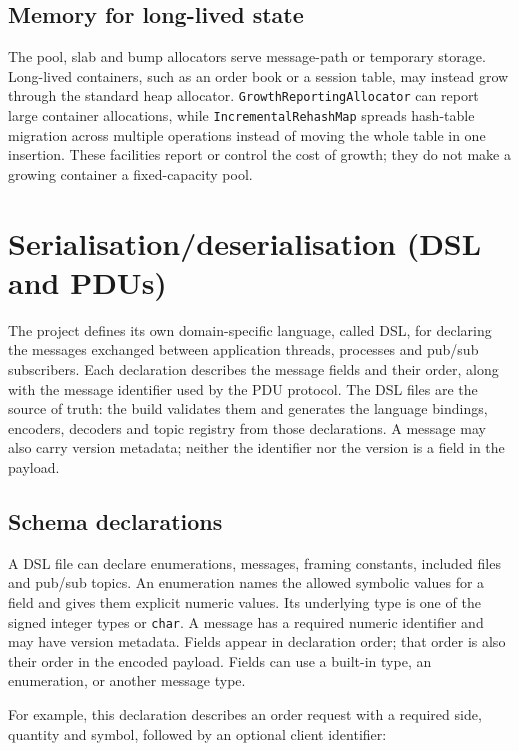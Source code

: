 \subsection{Memory for long-lived state}

The pool, slab and bump allocators serve message-path or temporary storage.
Long-lived containers, such as an order book or a session table, may instead
grow through the standard heap allocator. \texttt{GrowthReportingAllocator}
can report large container allocations, while \texttt{IncrementalRehashMap}
spreads hash-table migration across multiple operations instead of moving the
whole table in one insertion. These facilities report or control the cost of
growth; they do not make a growing container a fixed-capacity pool.

\section{Serialisation/deserialisation (DSL and PDUs)}
\label{sec:fw_dsl}

The project defines its own domain-specific language, called DSL, for
declaring the messages exchanged between application threads, processes and
pub/sub subscribers. Each declaration describes the message fields and their
order, along with the message identifier used by the PDU protocol. The DSL
files are the source of truth: the build validates them and generates the
language bindings, encoders, decoders and topic registry from those
declarations. A message may also carry version metadata; neither the
identifier nor the version is a field in the payload.

\subsection{Schema declarations}

A DSL file can declare enumerations, messages, framing constants, included
files and pub/sub topics. An enumeration names the allowed symbolic values
for a field and gives them explicit numeric values. Its underlying type is
one of the signed integer types or \texttt{char}. A message has a required
numeric identifier and may have version metadata. Fields appear in
declaration order; that order is also their order in the encoded payload.
Fields can use a built-in type, an enumeration, or another message type.

For example, this declaration describes an order request with a required
side, quantity and symbol, followed by an optional client identifier:

